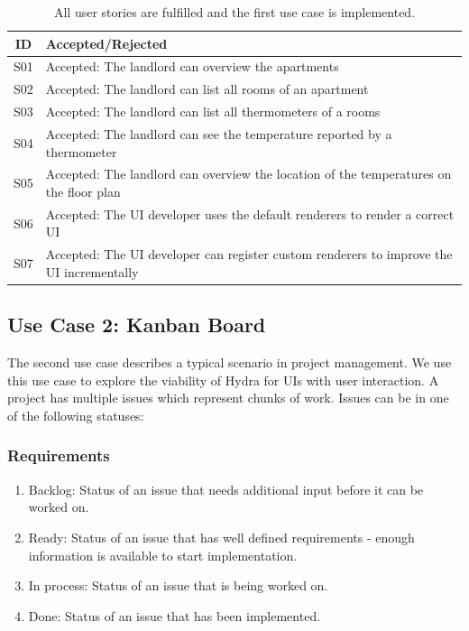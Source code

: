 \begin{table}
  \begin{center}
    \begin{tabular}{ |c|l| }
      \hline
      ID & Accepted/Rejected \\
      \hline
      S01 & Accepted: The landlord can overview the apartments \\
      S02 & Accepted: The landlord can list all rooms of an apartment \\
      S03 & Accepted: The landlord can list all thermometers of a rooms \\
      S04 & Accepted: The landlord can see the temperature reported by a thermometer \\
      S05 & Accepted: The landlord can overview the location of the temperatures on the floor plan \\
      S06 & Accepted: The UI developer uses the default renderers to render a correct UI \\
      S07 & Accepted: The UI developer can register custom renderers to improve the UI incrementally \\
      \hline
    \end{tabular}
    \caption{All user stories are fulfilled and the first use case is implemented.}
  \end{center}
\end{table}

\subsection{Use Case 2: Kanban Board}
The second use case describes a typical scenario in project management. We use this use case to explore the viability of Hydra for UIs with user interaction. A project has multiple issues which represent chunks of work. Issues can be in one of the following statuses:

\subsubsection{Requirements}

\begin{enumerate}
  \item Backlog: Status of an issue that needs additional input before it can be worked on.
  \item Ready: Status of an issue that has well defined requirements - enough information is available to start implementation.
  \item In process: Status of an issue that is being worked on.
  \item Done: Status of an issue that has been implemented.
\end{enumerate}

